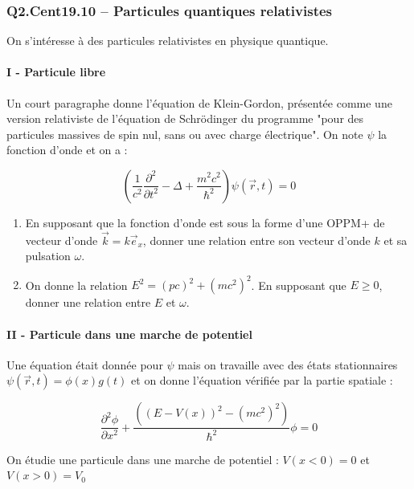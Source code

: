\subsubsection*{Q2.Cent19.10 -- Particules quantiques relativistes  \lesdeux}

On s'intéresse à des particules relativistes en physique quantique.

\paragraph{I - Particule libre}

Un court paragraphe donne l'équation de Klein-Gordon, présentée comme une version relativiste de l'équation de Schrödinger du programme "pour des particules massives de spin nul, sans ou avec charge électrique". On note $\psi$ la fonction d'onde et on a :

$$\left(\frac{1}{c^{2}}\frac{\partial^{2}}{\partial t^{2}} - \Delta + \frac{m^{2}c^{2}}{\hbar^{2}}\right)\psi(\vec{r}, t) = 0$$

\begin{enumerate}
\item En supposant que la fonction d'onde est sous la forme d'une OPPM+ de vecteur d'onde $\vec{k} = k\vec{e}_{x}$, donner une relation entre son vecteur d'onde $k$ et sa pulsation $\omega$.
\item On donne la relation $E^{2} = (pc)^{2} + (mc^{2})^{2}$. En supposant que $E \geq 0$, donner une relation entre $E$ et $\omega$.
\end{enumerate}

\paragraph{II - Particule dans une marche de potentiel}

Une équation était donnée pour $\psi$ mais on travaille avec des états stationnaires $\psi(\vec{r},t) = \phi(x)g(t)$ et on donne l'équation vérifiée par la partie spatiale :

$$\frac{\partial^{2}\phi}{\partial x^{2}} + \frac{((E - V(x))^{2} - (mc^{2})^{2})}{\hbar^{2}}\phi = 0$$

On étudie une particule dans une marche de potentiel : $V(x < 0) = 0$ et $V(x > 0) = V_{0}$

